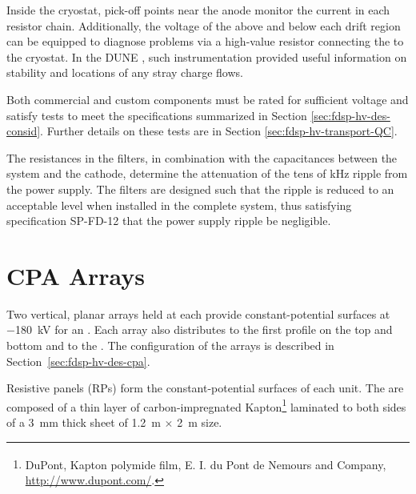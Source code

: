 Inside the cryostat, pick-off points near the anode monitor the current  
in each resistor chain.  Additionally, the voltage of the  above and below each drift region can be equipped to diagnose problems via a high-value resistor connecting the  to the cryostat.  In the DUNE , such instrumentation provided useful information on  stability and locations of %
any stray charge flows. %

Both commercial and custom  components must be rated for sufficient voltage and satisfy tests to meet the specifications %
summarized in Section \ref{sec:fdsp-hv-des-consid}.  Further details on these tests are in Section \ref{sec:fdsp-hv-transport-QC}.

The resistances in the filters, in combination with the capacitances between the  system and the cathode,
 determine the attenuation of the tens of \si{\kilo\hertz} ripple from the power supply.  The filters  
are designed such that the ripple is reduced to an acceptable level when installed in the complete system, thus satisfying specification %
SP-FD-12   %
that the power supply ripple be negligible. %

\section{CPA Arrays}
\label{sec:fdsp-hv-cpa-arrays}

Two vertical, planar  arrays held at  each provide constant-potential surfaces at \SI{-180}{\kV} for an . Each  array also distributes  to the first profile on the top and bottom  and to the . The configuration of the  arrays is described in Section~\ref{sec:fdsp-hv-des-cpa}.

Resistive panels (RPs) form the constant-potential surfaces of each  unit. The  are  composed of a thin layer of carbon-impregnated Kapton\footnote{DuPont\texttrademark{}, Kapton\textsuperscript{\textregistered} polymide film,  E. I. du Pont de Nemours and Company,  \url{http://www.dupont.com/}.} laminated to both sides of a \SI{3}{\milli\meter} thick \frfour sheet of \SI{1.2}{\meter}  $\times$ \SI{2}{\meter} size.  

